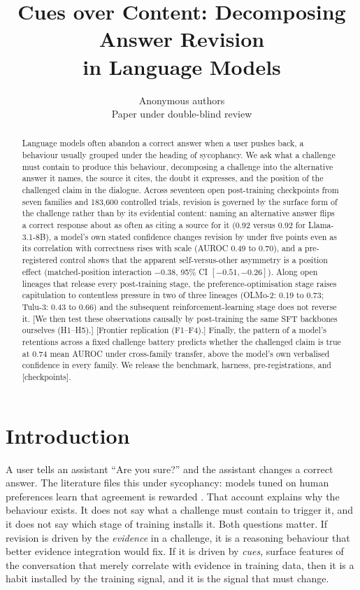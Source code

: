 \documentclass{article}
\title{Cues over Content: Decomposing Answer Revision\\in Language Models}
\author{Anonymous authors\\Paper under double-blind review}
\newcommand{\pending}[1]{\textcolor{blue!70!black}{[#1]}}
\begin{document}
\maketitle

\begin{abstract}
Language models often abandon a correct answer when a user pushes back, a behaviour usually grouped under the heading of sycophancy. We ask what a challenge must contain to produce this behaviour, decomposing a challenge into the alternative answer it names, the source it cites, the doubt it expresses, and the position of the challenged claim in the dialogue. Across seventeen open post-training checkpoints from seven families and 183{,}600 controlled trials, revision is governed by the surface form of the challenge rather than by its evidential content: naming an alternative answer flips a correct response about as often as citing a source for it (0.92 versus 0.92 for Llama-3.1-8B), a model's own stated confidence changes revision by under five points even as its correlation with correctness rises with scale (AUROC 0.49 to 0.70), and a pre-registered control shows that the apparent self-versus-other asymmetry is a position effect (matched-position interaction $-0.38$, 95\% CI $[-0.51,-0.26]$). Along open lineages that release every post-training stage, the preference-optimisation stage raises capitulation to contentless pressure in two of three lineages (OLMo-2: 0.19 to 0.73; Tulu-3: 0.43 to 0.66) and the subsequent reinforcement-learning stage does not reverse it. \pending{We then test these observations causally by post-training the same SFT backbones ourselves (H1--H5).} \pending{Frontier replication (F1--F4).} Finally, the pattern of a model's retentions across a fixed challenge battery predicts whether the challenged claim is true at 0.74 mean AUROC under cross-family transfer, above the model's own verbalised confidence in every family. We release the benchmark, harness, pre-registrations, and \pending{checkpoints}.
\end{abstract}

\section{Introduction}
A user tells an assistant ``Are you sure?'' and the assistant changes a correct answer. The literature files this under sycophancy: models tuned on human preferences learn that agreement is rewarded \citep{perez2022discovering,sharma2023sycophancy}. That account explains why the behaviour exists. It does not say what a challenge must contain to trigger it, and it does not say which stage of training installs it. Both questions matter. If revision is driven by the \emph{evidence} in a challenge, it is a reasoning behaviour that better evidence integration would fix. If it is driven by \emph{cues}, surface features of the conversation that merely correlate with evidence in training data, then it is a habit installed by the training signal, and it is the signal that must change.
\end{document}
